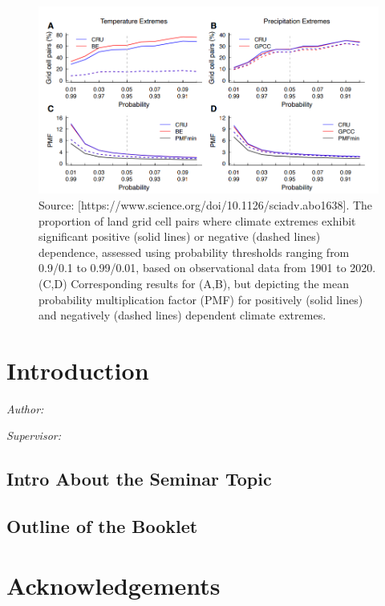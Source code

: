 \documentclass[
]{krantz}
\begin{document}
\vspace{1em}
\begin{figure}

{\centering \includegraphics[width=0.8\linewidth]{work/06-anthropo/figures/sensitivity} 

}

\caption{Source: [https://www.science.org/doi/10.1126/sciadv.abo1638]. The proportion of land grid cell pairs where climate extremes exhibit significant positive (solid lines) or negative (dashed lines) dependence, assessed using probability thresholds ranging from 0.9/0.1 to 0.99/0.01, based on observational data from 1901 to 2020. (C,D) Corresponding results for (A,B), but depicting the mean probability multiplication factor (PMF) for positively (solid lines) and negatively (dashed lines) dependent climate extremes.}\label{fig:unnamed-chunk-10}
\end{figure}
\vspace{1em}

\chapter{Introduction}\label{introduction-4}

\emph{Author: }

\emph{Supervisor: }

\section{Intro About the Seminar Topic}\label{intro-about-the-seminar-topic-2}

\section{Outline of the Booklet}\label{outline-of-the-booklet-2}

\chapter{Acknowledgements}\label{acknowledgements}
\end{document}
